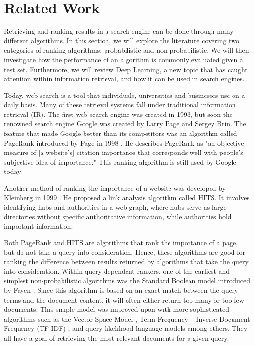 \section{Related Work}
Retrieving and ranking results in a search engine can be done through many different algorithms. In this section, we will explore the literature covering two categories of ranking algorithms: probabilistic and non-probabilistic. We will then investigate how the performance of an algorithm is commonly evaluated given a test set. Furthermore, we will review Deep Learning, a new topic that has caught attention within information retrieval, and how it can be used in search engines.

Today, web search is a tool that individuals, universities and businesses use on a daily basis. Many of these retrieval systems fall under traditional information retrieval (IR). The first web search engine was created in 1993, but soon the renowned search engine Google was created by Larry Page and Sergey Brin. The feature that made Google better than its competitors was an algorithm called PageRank introduced by Page in 1998 \cite{brin1998anatomy}. He describes PageRank as "an objective measure of [a website's] citation importance that corresponds well with people's subjective idea of importance." This ranking algorithm is still used by Google today.

Another method of ranking the importance of a website was developed by Kleinberg in 1999 \cite{kleinberg1999authoritative}. He proposed a link analysis algorithm called HITS. It involves identifying hubs and authorities in a web graph, where hubs serve as large directories without specific authoritative information, while authorities hold important information. %

Both PageRank and HITS are algorithms that rank the importance of a page, but do not take a query into consideration.
Hence, these algorithms are good for ranking the difference between results returned by algorithms that take the query into consideration.
Within query-dependent rankers, one of the earliest and simplest non-probabilistic algorithms was the Standard Boolean model introduced by Fayen \cite{lancaster1973information}. Since this algorithm is based on an exact match between the query terms and the document content, it will often either return too many or too few documents. This simple model was improved upon with more sophisticated algorithms such as the Vector Space Model \cite{salton1975vector}, Term Frequency -- Inverse Document Frequency (TF-IDF) \cite{salton1983mcgill}, and query likelihood language models \cite{zhai2001model} among others. They all have a goal of retrieving the most relevant documents for a given query. \\

